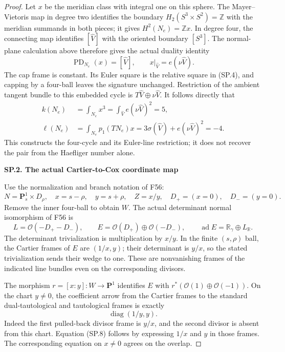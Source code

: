 \begin{proof}
Let \(x\) be the meridian class with integral one on this sphere.
The Mayer--Vietoris map in degree two identifies the boundary
\(H_2(S^3\times S^2)=\mathbb Z\) with the meridian summands in
both pieces; it gives \(H^2(N_e)=\mathbb Zx\). In degree four,
the connecting map identifies \([\widehat V]\) with the oriented
boundary \([S^3]\). The normal-plane calculation above therefore
gives the actual duality identity
\[
       \operatorname{PD}_{N_e}(x)=[\widehat V],\qquad
       x|_{\widehat V}=e(\nu\widehat V).                 \tag{SP.5}
\]
The cap frame is constant. Its Euler square is the relative square
in (SP.4), and capping by a four-ball leaves the signature unchanged.
Restriction of the ambient tangent bundle to this embedded cycle is
\(T\widehat V\oplus\nu\widehat V\). It follows directly that
\[
 \begin{aligned}
 k(N_e)&=\int_{N_e}x^3=\int_{\widehat V}e(\nu\widehat V)^2=5,\\
 \ell(N_e)&=\int_{N_e}p_1(TN_e)x
       =3\sigma(\widehat V)+e(\nu\widehat V)^2=-4.
 \end{aligned}                                             \tag{SP.6}
\]
This constructs the four-cycle and its Euler-line restriction; it
does not recover the pair from the Haefliger number alone.

\par

\medskip\noindent\textbf{SP.2. The actual Cartier-to-Cox coordinate map}

\par\nobreak

Use the normalization and branch notation of F56:
\[
 N=\mathbf P^1_s\times D_\rho,\quad
 x=s-\rho,\quad y=s+\rho,\quad Z=x/y,\quad
 D_+=(x=0),\quad D_-=(y=0).
\]
Remove the inner four-ball to obtain \(W\). The actual determinant
normal isomorphism of F56 is
\[
 L=\mathcal O(-D_+-D_-),\qquad
 E=\mathcal O(D_+)\oplus\mathcal O(-D_-),\qquad
 \operatorname{ad}E=\mathbb R_\gamma\oplus L_{\mathbb R}.
                                                               \tag{SP.7}
\]
The determinant trivialization is multiplication by \(x/y\).
In the finite \((s,\rho)\) ball, the Cartier frames of \(E\) are
\((1/x,y)\); their determinant is \(y/x\), so the stated
trivialization sends their wedge to one. These are nonvanishing
frames of the indicated line bundles even on the corresponding
divisors.

The morphism \(r=[x:y]:W\to\mathbf P^1\) identifies \(E\)
with \(r^*(\mathcal O(1)\oplus\mathcal O(-1))\). On the chart
\(y\ne0\), the coefficient arrow from the Cartier frames to the
standard dual-tautological and tautological frames is exactly
\[
                         \operatorname{diag}(1/y,y).      \tag{SP.8}
\]
Indeed the first pulled-back divisor frame is \(y/x\), and the
second divisor is absent from this chart. Equation (SP.8) follows by
expressing \(1/x\) and \(y\) in those frames. The corresponding
equation on \(x\ne0\) agrees on the overlap.


\end{proof}
